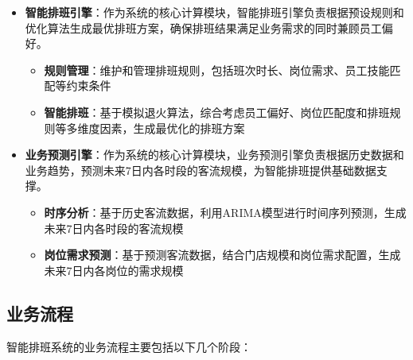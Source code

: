 \documentclass{ctexart}
\begin{document}
\begin{itemize}
    \item \textbf{智能排班引擎}：作为系统的核心计算模块，智能排班引擎负责根据预设规则和优化算法生成最优排班方案，确保排班结果满足业务需求的同时兼顾员工偏好。
        \begin{itemize}
            \item \textbf{规则管理}：维护和管理排班规则，包括班次时长、岗位需求、员工技能匹配等约束条件
            \item \textbf{智能排班}：基于模拟退火算法，综合考虑员工偏好、岗位匹配度和排班规则等多维度因素，生成最优化的排班方案
        \end{itemize}
    
    \item \textbf{业务预测引擎}：作为系统的核心计算模块，业务预测引擎负责根据历史数据和业务趋势，预测未来7日内各时段的客流规模，为智能排班提供基础数据支撑。
        \begin{itemize}
            \item \textbf{时序分析}：基于历史客流数据，利用ARIMA模型进行时间序列预测，生成未来7日内各时段的客流规模
            \item \textbf{岗位需求预测}：基于预测客流数据，结合门店规模和岗位需求配置，生成未来7日内各岗位的需求规模
        \end{itemize}
    
\end{itemize}

\subsection{业务流程}
智能排班系统的业务流程主要包括以下几个阶段：
\end{document}
